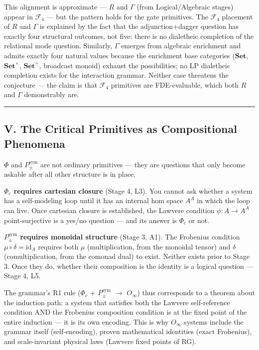 \documentclass[12pt,a4paper]{article}
\begin{document}
This alignment is approximate --- $R$ and $\Gamma$ (from Logical/Algebraic stages) appear in $\mathcal{F}_4$ --- but the pattern holds for the gate primitives. The $\mathcal{F}_4$ placement of $R$ and $\Gamma$ is explained by the fact that the adjunction+dagger question has exactly four structural outcomes, not five: there is no dialetheic completion of the relational mode question. Similarly, $\Gamma$ emerges from algebraic enrichment and admits exactly four natural values because the enrichment base categories ($\mathbf{Set}$, $\mathbf{Set}^\times$, $\mathbf{Set}^+$, broadcast monoid) exhaust the possibilities; no LP dialetheic completion exists for the interaction grammar. Neither case threatens the conjecture --- the claim is that $\mathcal{F}_4$ primitives are FDE-evaluable, which both $R$ and $\Gamma$ demonstrably are.\begin{center}
\rule{0.5\textwidth}{0.4pt}
\end{center}

\subsection{V. The Critical Primitives as Compositional Phenomena}

$\Phi$ and $P_{\pm}^{\text{sym}}$ are not ordinary primitives --- they are questions that only become askable after all other structure is in place.

\textbf{$\Phi_c$ requires cartesian closure} (Stage 4, L3). You cannot ask whether a system has a self-modeling loop until it has an internal hom space $A^A$ in which the loop can live. Once cartesian closure is established, the Lawvere condition $\phi: A \to A^A$ point-surjective is a yes/no question --- and its answer is $\Phi_c$ or not.

\textbf{$P_{\pm}^{\text{sym}}$ requires monoidal structure} (Stage 3, A1). The Frobenius condition $\mu \circ \delta = \text{id}_A$ requires both $\mu$ (multiplication, from the monoidal tensor) and $\delta$ (comultiplication, from the comonad dual) to exist. Neither exists prior to Stage 3. Once they do, whether their composition is the identity is a logical question --- Stage 4, L5.

The grammar's R1 rule ($\Phi_c$ + $P_{\pm}^{\text{sym}}$ $\rightarrow$ $O_{\infty}$) thus corresponds to a theorem about the induction path: a system that satisfies both the Lawvere self-reference condition AND the Frobenius composition condition is at the fixed point of the entire induction --- it is its own encoding. This is why $O_{\infty}$ systems include the grammar itself (self-encoding), proven mathematical identities (exact Frobenius), and scale-invariant physical laws (Lawvere fixed points of RG).
\end{document}

